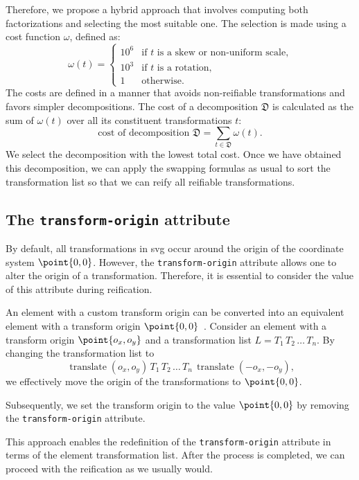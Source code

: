 Therefore, we propose a hybrid approach that involves computing both factorizations and selecting the most suitable one. The selection is made using a cost function $\omega$, defined as:
\[
    \omega(t) = 
    \begin{cases}
        10^6 & \text{if $t$ is a skew or non-uniform scale,} \\
        10^3 & \text{if $t$ is a rotation,} \\
        1 & \text{otherwise.}
    \end{cases}
\]
The costs are defined in a manner that avoids non-reifiable transformations and favors simpler decompositions. The cost of a decomposition $\mathfrak{D}$ is calculated as the sum of $\omega(t)$ over all its constituent transformations $t$:
\[
    \text{cost of decomposition }\mathfrak{D} = \sum_{t \in \mathfrak{D}}{\omega(t)}\text{.}
\]
We select the decomposition with the lowest total cost. Once we have obtained this decomposition, we can apply the swapping formulas as usual to sort the transformation list so that we can reify all reifiable transformations.

\subsection{The \texttt{transform-origin} attribute} \label{transform-origin-reify}

By default, all transformations in \gls{svg} occur around the origin of the coordinate system $\point{0, 0}$. However, the \texttt{transform-origin} attribute allows one to alter the origin of a transformation. Therefore, it is essential to consider the value of this attribute during reification.

An element with a custom transform origin can be converted into an equivalent element with a transform origin $\point{0, 0}$~\cite{mdn_transform_origin}. Consider an element with a transform origin $\point{o_x, o_y}$ and a transformation list $L = T_1\,T_2\,\ldots\,T_n$. By changing the transformation list to
    \[
        \operatorname{translate}\left(o_x, o_y\right)\,T_1\,T_2\,\ldots\,T_n\,\operatorname{translate}\left(-o_x, -o_y\right)\text{,}
    \]
we effectively move the origin of the transformations to $\point{0, 0}$.

Subsequently, we set the transform origin to the value $\point{0, 0}$ by removing the \texttt{transform-origin} attribute. 

This approach enables the redefinition of the \texttt{transform-origin} attribute in terms of the element transformation list. After the process is completed, we can proceed with the reification as we usually would.

